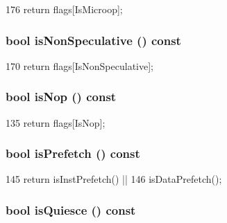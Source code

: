 \begin{DoxyCode}
176 { return flags[IsMicroop]; }
\end{DoxyCode}
\hypertarget{classStaticInst_af032774c8da8aea2d9d84d5f3f211a7f}{
\subsubsection[{isNonSpeculative}]{\setlength{\rightskip}{0pt plus 5cm}bool isNonSpeculative () const}}
\label{classStaticInst_af032774c8da8aea2d9d84d5f3f211a7f}



\begin{DoxyCode}
170 { return flags[IsNonSpeculative]; }
\end{DoxyCode}
\hypertarget{classStaticInst_a45dbb9ace4c729e7bb701ce535fb1667}{
\subsubsection[{isNop}]{\setlength{\rightskip}{0pt plus 5cm}bool isNop () const}}
\label{classStaticInst_a45dbb9ace4c729e7bb701ce535fb1667}



\begin{DoxyCode}
135 { return flags[IsNop]; }
\end{DoxyCode}
\hypertarget{classStaticInst_a1eef1bb814a1f77346aba1648fb6d1c9}{
\subsubsection[{isPrefetch}]{\setlength{\rightskip}{0pt plus 5cm}bool isPrefetch () const}}
\label{classStaticInst_a1eef1bb814a1f77346aba1648fb6d1c9}



\begin{DoxyCode}
145                                 { return isInstPrefetch() ||
146                                          isDataPrefetch(); }
\end{DoxyCode}
\hypertarget{classStaticInst_adc9467e7b34e8dff3964c85b66bb1b93}{
\subsubsection[{isQuiesce}]{\setlength{\rightskip}{0pt plus 5cm}bool isQuiesce () const}}
\label{classStaticInst_adc9467e7b34e8dff3964c85b66bb1b93}



